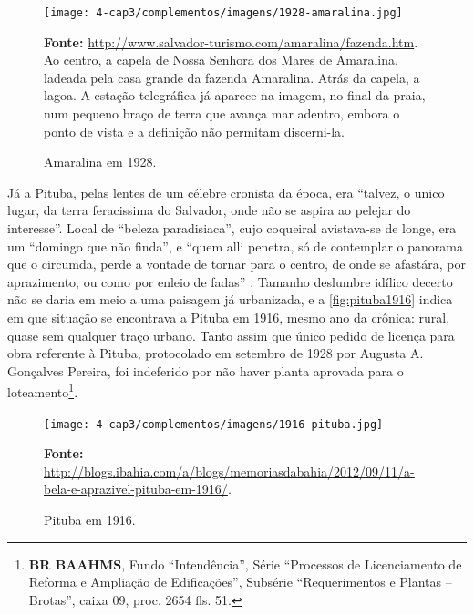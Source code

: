 \begin{figure}[!htp]
\centering
\caption{Amaralina em 1928.}
\texttt{[image: 4-cap3/complementos/imagens/1928-amaralina.jpg]}{\par \footnotesize \textbf{Fonte:} \url{http://www.salvador-turismo.com/amaralina/fazenda.htm}. Ao centro, a capela de Nossa Senhora dos Mares de Amaralina, ladeada pela casa grande da fazenda Amaralina. Atrás da capela, a lagoa. A estação telegráfica já aparece na imagem, no final da praia, num pequeno braço de terra que avança mar adentro, embora o ponto de vista e a definição não permitam discerni-la.}
\label{fig:amaralina1928}
\end{figure}

Já a Pituba, pelas lentes de um célebre cronista da época, era ``talvez, o unico lugar, da terra feracissima do Salvador, onde não se aspira ao pelejar do interesse''. Local de ``beleza paradisiaca'', cujo coqueiral avistava-se de longe, era um ``domingo que não finda'', e ``quem alli penetra, só de contemplar o panorama que o circumda, perde a vontade de tornar para o centro, de onde se afastára, por aprazimento, ou como por enleio de fadas'' \cite{campos_pituba_1916}. Tamanho deslumbre idílico decerto não se daria em meio a uma paisagem já urbanizada, e a \autoref{fig:pituba1916} indica em que situação se encontrava a Pituba em 1916, mesmo ano da crônica: rural, quase sem qualquer traço urbano. Tanto assim que único pedido de licença para obra referente à Pituba, protocolado em setembro de 1928 por Augusta A. Gonçalves Pereira, foi indeferido por não haver planta aprovada para o loteamento\footnote{\textbf{BR BAAHMS}, Fundo ``Intendência'', Série ``Processos de Licenciamento de Reforma e Ampliação de Edificações'', Subsérie ``Requerimentos e Plantas -- Brotas'', caixa 09, proc. 2654 fls. 51.}.

\begin{figure}[!htp]
\centering
\caption{Pituba em 1916.}
\texttt{[image: 4-cap3/complementos/imagens/1916-pituba.jpg]}{\par \footnotesize \textbf{Fonte:} \url{http://blogs.ibahia.com/a/blogs/memoriasdabahia/2012/09/11/a-bela-e-aprazivel-pituba-em-1916/}.}
\label{fig:pituba1916}
\end{figure}


